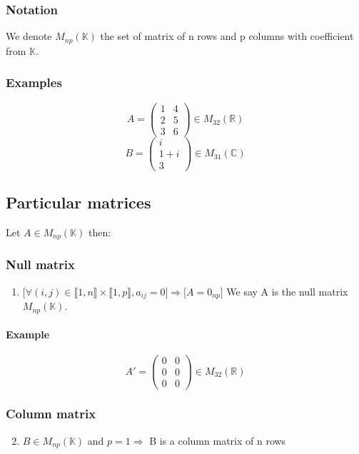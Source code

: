 \documentclass[notitlepage]{math}
\begin{document}
\subsubsection{Notation}
We denote $M_{np}(\mathbb{K})$ the set of matrix of n rows and p columns with coefficient from $\mathbb{K}$.
\subsubsection{Examples}

\[ A = \begin{pmatrix}
    1 & 4  \\
    2 & 5 \\
    3 & 6 
\end{pmatrix}\in M_{32}(\mathbb{R})\]
\[
B = \begin{pmatrix}
    i \\
    1 + i \\
    3
\end{pmatrix}\in M_{31}(\mathbb{C})\]

\subsection{Particular matrices}
Let $A \in M_{np}(\mathbb{K})$ then:
\subsubsection{Null matrix}
\begin{enumerate}
    \item  $\lbrack \forall (i,j) \in \llbracket 1,n \rrbracket \times \llbracket 1,p \rrbracket, a_{ij} = 0 \rbrack \Rightarrow \lbrack A = 0_{np} \rbrack$
    We say A is the null matrix $M_{np}(\mathbb{K})$.
\end{enumerate}
\paragraph{Example}
\[ A'=
\begin{pmatrix}
    0 & 0  \\
    0 & 0  \\
    0 & 0 
\end{pmatrix}\in M_{32}(\mathbb{R})\]

\subsubsection{Column matrix}
\begin{enumerate}
    \setcounter{enumi}{1}
    \item $B \in M_{np}(\mathbb{K})$ and $ p = 1 \Rightarrow $ B is a column matrix of n rows
\end{enumerate}
\end{document}
